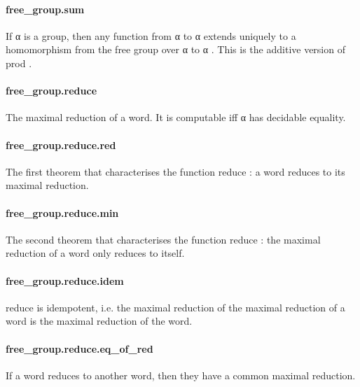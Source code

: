 \documentclass{article}
\begin{document}
\paragraph{free\_group.sum}
\par
If 
\colorbox[RGB]{253,246,227}{{{{\color[RGB]{101, 123, 131} α }}}} is a group, then any function from 
\colorbox[RGB]{253,246,227}{{{{\color[RGB]{101, 123, 131} α }}}} to 
\colorbox[RGB]{253,246,227}{{{{\color[RGB]{101, 123, 131} α }}}}extends uniquely to a homomorphism from the
free group over 
\colorbox[RGB]{253,246,227}{{{{\color[RGB]{101, 123, 131} α }}}} to 
\colorbox[RGB]{253,246,227}{{{{\color[RGB]{101, 123, 131} α }}}}. This is the additive
version of 
\colorbox[RGB]{253,246,227}{{{{\color[RGB]{101, 123, 131} prod }}}}.
\paragraph{free\_group.reduce}
\par
The maximal reduction of a word. It is computable
iff 
\colorbox[RGB]{253,246,227}{{{{\color[RGB]{101, 123, 131} α }}}} has decidable equality.
\paragraph{free\_group.reduce.red}
\par
The first theorem that characterises the function
\colorbox[RGB]{253,246,227}{{{{\color[RGB]{101, 123, 131} reduce }}}}: a word reduces to its maximal reduction.
\paragraph{free\_group.reduce.min}
\par
The second theorem that characterises the
function 
\colorbox[RGB]{253,246,227}{{{{\color[RGB]{101, 123, 131} reduce }}}}: the maximal reduction of a word
only reduces to itself.
\paragraph{free\_group.reduce.idem}
\par
\colorbox[RGB]{253,246,227}{{{{\color[RGB]{101, 123, 131} reduce }}}} is idempotent, i.e. the maximal reduction
of the maximal reduction of a word is the maximal
reduction of the word.
\paragraph{free\_group.reduce.eq\_of\_red}
\par
If a word reduces to another word, then they have
a common maximal reduction.
\end{document}
